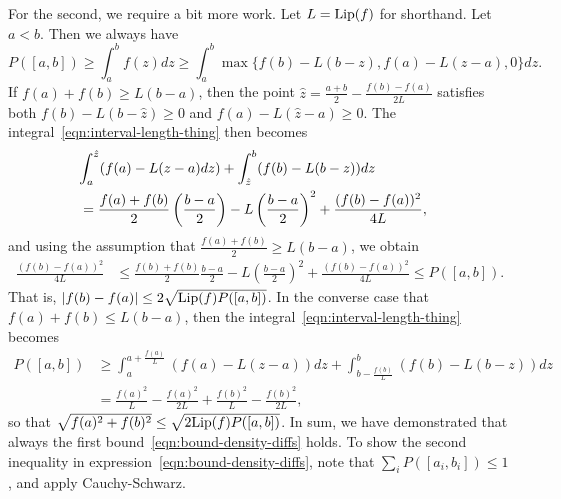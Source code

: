 For the second, we require a bit more work.
Let $L = {\rm \textup{Lip}}(f)$ for shorthand. Let $a < b$.
Then we always have
\begin{equation}
  \label{eqn:interval-length-thing}
  P([a, b])
  \ge \int_a^b f(z) dz
  \ge \int_a^b \max\{f(b) - L (b - z), f(a) - L(z - a), 0\} dz.
\end{equation}
If $f(a) + f(b) \ge L (b - a)$, then the point $\hat{z} =
\frac{a + b}{2} - \frac{f(b) - f(a)}{2L}$ satisfies both $f(b) - L(b -
\hat{z}) \ge 0$ and $f(a) - L(\hat{z} - a) \ge 0$. The
integral~\eqref{eqn:interval-length-thing} then becomes
\begin{align*}
  \lefteqn{\int_a^{\hat{z}}
    (f(a) - L (z - a) dz)
    + \int_{\hat{z}}^b
    (f(b) - L (b - z)) dz} \\
  & = \frac{f(a) + f(b)}{2}
  \left(\frac{b - a}{2}\right)
  - L \left(\frac{b - a}{2} \right)^2
  + \frac{(f(b) - f(a))^2}{4L},
\end{align*}
and using the assumption that $\frac{f(a) + f(b)}{2} \ge L(b - a)$,
we obtain
\begin{align*}
  \frac{(f(b) - f(a))^2}{4L}
  & \le \frac{f(b) + f(b)}{2} \frac{b - a}{2}
  - L \left(\frac{b - a}{2}\right)^2
  + \frac{(f(b) - f(a))^2}{4L}
  \le P([a, b]).
\end{align*}
That is, $|f(b) - f(a)| \le 2 \sqrt{{\rm \textup{Lip}}(f) P([a, b])}$.
In the converse case that $f(a) + f(b) \le L(b - a)$, then
the integral~\eqref{eqn:interval-length-thing} becomes
\begin{align*}
  P([a, b])
  & \ge \int_a^{a + \frac{f(a)}{L}}
  (f(a) - L (z - a)) dz
  + \int_{b - \frac{f(b)}{L}}^b (f(b) - L (b - z)) dz \\
  & = \frac{f(a)^2}{L}
  - \frac{f(a)^2}{2L}
  + \frac{f(b)^2}{L}
  - \frac{f(b)^2}{2L},
\end{align*}
so that $\sqrt{f(a)^2 + f(b)^2} \le \sqrt{2 {\rm \textup{Lip}}(f) P([a, b])}$.  In sum,
we have demonstrated that always the first
bound~\eqref{eqn:bound-density-diffs} holds.
To show the second inequality in expression~\eqref{eqn:bound-density-diffs},
note that
$\sum_i P([a_i, b_i]) \le 1$, and apply Cauchy-Schwarz.

